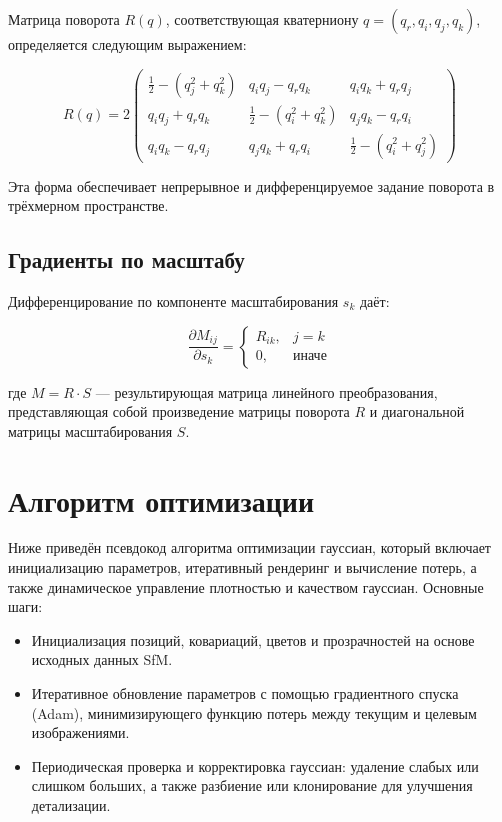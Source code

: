 Матрица поворота $R(q)$, соответствующая кватерниону $q = (q_r, q_i, q_j, q_k)$, определяется следующим выражением:

\[
R(q) = 2
\begin{pmatrix}
\frac{1}{2} - (q_j^2 + q_k^2) & q_i q_j - q_r q_k & q_i q_k + q_r q_j \\
q_i q_j + q_r q_k & \frac{1}{2} - (q_i^2 + q_k^2) & q_j q_k - q_r q_i \\
q_i q_k - q_r q_j & q_j q_k + q_r q_i & \frac{1}{2} - (q_i^2 + q_j^2)
\end{pmatrix}
\]

Эта форма обеспечивает непрерывное и дифференцируемое задание поворота в трёхмерном пространстве.

\subsection{Градиенты по масштабу}

Дифференцирование по компоненте масштабирования $s_k$ даёт:

\[
\frac{\partial M_{ij}}{\partial s_k} = 
\begin{cases}
R_{ik}, & j = k \\
0, & \text{иначе}
\end{cases}
\]

где $M = R \cdot S$ — результирующая матрица линейного преобразования, представляющая собой произведение матрицы поворота $R$ и диагональной матрицы масштабирования $S$.

\section{Алгоритм оптимизации}

Ниже приведён псевдокод алгоритма оптимизации гауссиан, который включает инициализацию параметров, итеративный рендеринг и вычисление потерь, а также динамическое управление плотностью и качеством гауссиан. Основные шаги:

\begin{itemize}
    \item Инициализация позиций, ковариаций, цветов и прозрачностей на основе исходных данных SfM.
    \item Итеративное обновление параметров с помощью градиентного спуска (Adam), минимизирующего функцию потерь между текущим и целевым изображениями.
    \item Периодическая проверка и корректировка гауссиан: удаление слабых или слишком больших, а также разбиение или клонирование для улучшения детализации.
\end{itemize}


